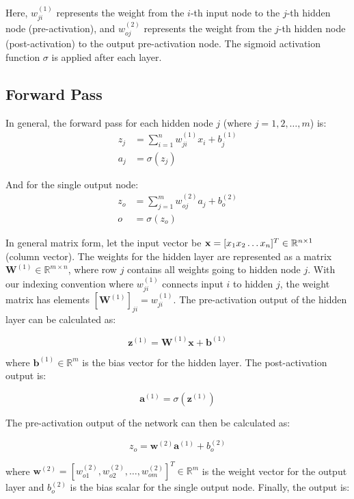 \documentclass[12pt]{article}
\begin{document}
Here, $w_{ji}^{(1)}$ represents the weight from the $i$-th input node to the $j$-th hidden node (pre-activation), and $w_{oj}^{(2)}$ represents the weight from the $j$-th hidden node (post-activation) to the output pre-activation node. The sigmoid activation function $\sigma$ is applied after each layer.

\subsection{Forward Pass}

In general, the forward pass for each hidden node $j$ (where $j = 1, 2, \ldots, m$) is:
\begin{align*}
z_j &= \sum_{i=1}^{n} w_{ji}^{(1)} x_i + b_j^{(1)} \\
a_j &= \sigma(z_j)
\end{align*}

And for the single output node:
\begin{align*}
z_o &= \sum_{j=1}^{m} w_{oj}^{(2)} a_j + b_o^{(2)} \\
o &= \sigma(z_o)
\end{align*}

In general matrix form, let the input vector be $\mathbf{x} = [x_1 \space\space x_2 \space\space \ldots \space\space x_n]^T \in \mathbb{R}^{n \times 1}$ (column vector). The weights for the hidden layer are represented as a matrix $\mathbf{W}^{(1)} \in \mathbb{R}^{m \times n}$, where row $j$ contains all weights going to hidden node $j$. With our indexing convention where $w_{ji}^{(1)}$ connects input $i$ to hidden $j$, the weight matrix has elements $[\mathbf{W}^{(1)}]_{ji} = w_{ji}^{(1)}$. The pre-activation output of the hidden layer can be calculated as:

\[ \mathbf{z}^{(1)} = \mathbf{W}^{(1)} \mathbf{x} + \mathbf{b}^{(1)} \]

where $\mathbf{b}^{(1)} \in \mathbb{R}^m$ is the bias vector for the hidden layer. The post-activation output is:

\[ \mathbf{a}^{(1)} = \sigma\left(\mathbf{z}^{(1)}\right) \]

The pre-activation output of the network can then be calculated as:

\[ z_o = \mathbf{w}^{(2)} \mathbf{a}^{(1)} + b_o^{(2)} \]

where $\mathbf{w}^{(2)} = [w_{o1}^{(2)}, w_{o2}^{(2)}, \ldots, w_{om}^{(2)}]^T \in \mathbb{R}^m$ is the weight vector for the output layer and $b_o^{(2)}$ is the bias scalar for the single output node. Finally, the output is:
\end{document}
